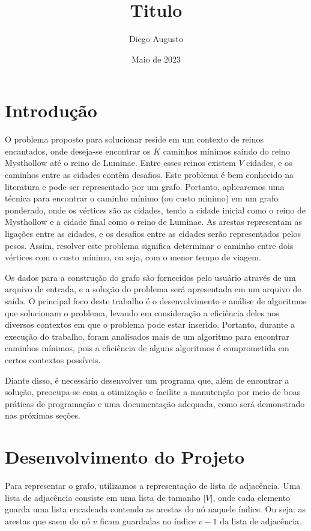 \documentclass{article}
\title{Titulo}
\date{Maio de 2023}
\author{Diego Augusto}
\begin{document}

    \maketitle
    \newpage
    \section{Introdução}
    O problema proposto para solucionar reside em um contexto de reinos
    encantados, onde deseja-se encontrar os $K$ caminhos mínimos saindo do reino Mysthollow até o reino de Luminae. Entre esses
    reinos existem $V$ cidades, e os caminhos entre as cidades contêm desafios. Este
    problema é bem conhecido na literatura e pode ser representado por um grafo.
    Portanto, aplicaremos uma técnica para encontrar o caminho mínimo (ou custo
    mínimo) em um grafo ponderado, onde os vértices são as cidades, tendo a
    cidade inicial como o reino de Mysthollow e a cidade final como o reino de
    Luminae. As arestas representam as ligações entre as cidades, e os desafios
    entre as cidades serão representados pelos pesos. Assim, resolver este
    problema significa determinar o caminho entre dois vértices com o custo
    mínimo, ou seja, com o menor tempo de viagem.

    Os dados para a construção do grafo são fornecidos pelo usuário através de um
    arquivo de entrada, e a solução do problema será apresentada em um arquivo de
    saída. O principal foco deste trabalho é o desenvolvimento e análise de
    algoritmos que solucionam o problema, levando em consideração a eficiência deles
    nos diversos contextos em que o problema pode estar inserido. Portanto, durante
    a execução do trabalho, foram analisados mais de um algoritmo para encontrar
    caminhos mínimos, pois a eficiência de alguns algoritmos é comprometida em
    certos contextos possíveis.

    Diante disso, é necessário desenvolver um programa que, além de encontrar a
    solução, preocupa-se com a otimização e facilite a manutenção por meio de boas
    práticas de programação e uma documentação adequada, como será demonstrado nas
    próximas seções.
    \section{Desenvolvimento do Projeto}
    Para representar o grafo, utilizamos a representação de lista de adjacência.
    Uma lista de adjacência consiste em uma lista de tamanho $|V|$, onde cada
    elemento guarda uma lista encadeada contendo as arestas do nó naquele
    índice. Ou seja: as arestas que saem do nó $v$ ficam guardadas no índice
    $v-1$ da lista de adjacência.
\end{document}
